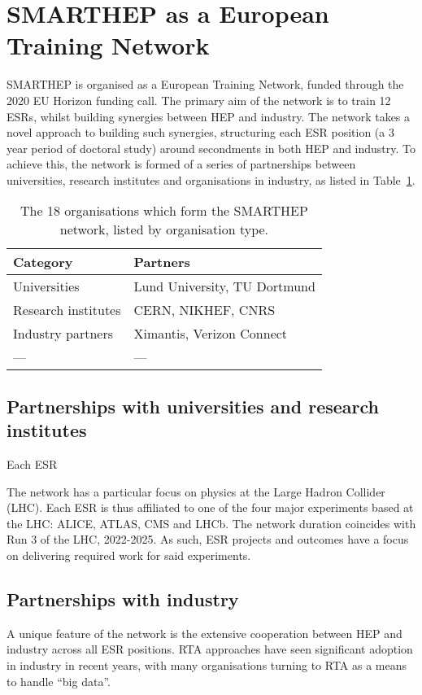 \section{SMARTHEP as a European Training Network}
\label{network}
SMARTHEP is organised as a European Training Network, funded through the 2020 EU Horizon funding call. The primary aim of the network is to train 12 ESRs, whilst building synergies between HEP and industry. The network takes a novel approach to building such synergies, structuring each ESR position (a 3 year period of doctoral study) around secondments in both HEP and industry. To achieve this, the network is formed of a series of partnerships between universities, research institutes and organisations in industry, as listed in Table~\ref{partners}.

\begin{table}[h!]
    \centering
    \caption{The 18 organisations which form the SMARTHEP network, listed by organisation type.}
    \label{partners}       
    \begin{tabular}{ll}
    \hline
    Category & Partners \\\hline
    Universities        & Lund University, TU Dortmund \\
    Research institutes & CERN, NIKHEF, CNRS \\
    Industry partners   & Ximantis, Verizon Connect \\
    --- & --- \\\hline
    \end{tabular}
\end{table}


\subsection{Partnerships with universities and research institutes}
\label{sec-2}
Each ESR \par
The network has a particular focus on physics at the Large Hadron Collider (LHC). Each ESR is thus affiliated to one of the four major experiments based at the LHC: ALICE, ATLAS, CMS and LHCb. The network duration coincides with Run 3 of the LHC, 2022-2025. As such, ESR projects and outcomes have a focus on delivering required work for said experiments.

\subsection{Partnerships with industry}
\label{sec-2}
A unique feature of the network is the extensive cooperation between HEP and industry across all ESR positions. RTA approaches have seen significant adoption in industry in recent years, with many organisations turning to RTA as a means to handle ``big data''.